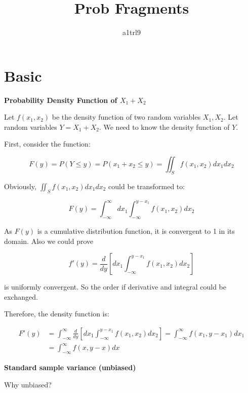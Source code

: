 \documentclass{article}
\title{Prob Fragments}
\author{a1trl9}
\date{}
\begin{document}
\maketitle

\section{Basic}

\textbf{Probability Density Function of \(X_1+X_2\)}

Let \(f(x_1, x_2)\) be the density function of two random variables \(X_1, X_2\). Let random variables \(Y=X_1 + X_2\). We need to know the density function
of \(Y\).

First, consider the function:

\begin{equation}
F(y) = P(Y \leq y)=P(x_1+x_2\leq y)=\iint_Sf(x_1,x_2)dx_1dx_2
\end{equation}

Obviously, $\iint_Sf(x_1,x_2)dx_1dx_2$ could be transformed to:

\begin{equation}
F(y) = \int_{-\infty}^{\infty}dx_1\int_{-\infty}^{y-x_1}f(x_1,x_2)dx_2
\end{equation}

As \(F(y)\) is a cumulative distribution function, it is convergent to 1 in its domain. Also we could prove 

\begin{equation}
f'(y)=\frac{d}{dy}[dx_1\int_{-\infty}^{y-x_1}f(x_1,x_2)dx_2]
\end{equation}

is uniformly
convergent. So the order if derivative and integral could be exchanged.

Therefore, the density function is:

\begin{equation}
\begin{split}
F'(y)&=\int_{-\infty}^{\infty}\frac{d}{dy}[dx_1\int_{-\infty}^{y-x_1}f(x_1,x_2)dx_2]=\int_{-\infty}^{\infty}f(x_1,y-x_1)dx_1\\
&=\int_{-\infty}^{\infty}f(x,y-x)dx
\end{split}
\end{equation}


\vspace{3mm}

\textbf{Standard sample variance (unbiased)}

Why unbiased?
\end{document}

